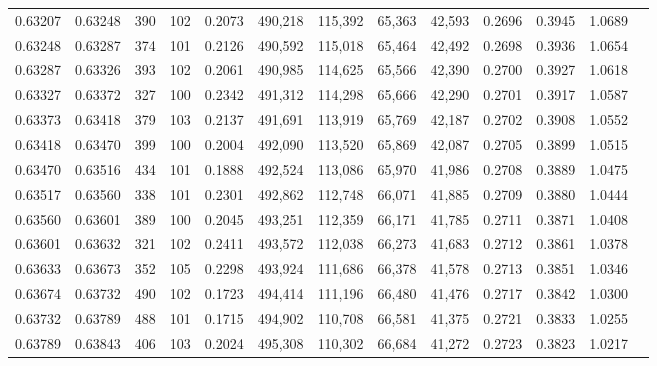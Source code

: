 \begin{tabular}{rrrrrrrrrrrrr}
0.63207 & 0.63248 &   390 & 102 &                                     0.2073 & 490,218 & 115,392 &  65,363 &  42,593 & 0.2696 & 0.3945 & 1.0689 \\
0.63248 & 0.63287 &   374 & 101 &                                     0.2126 & 490,592 & 115,018 &  65,464 &  42,492 & 0.2698 & 0.3936 & 1.0654 \\
0.63287 & 0.63326 &   393 & 102 &                                     0.2061 & 490,985 & 114,625 &  65,566 &  42,390 & 0.2700 & 0.3927 & 1.0618 \\
0.63327 & 0.63372 &   327 & 100 &                                     0.2342 & 491,312 & 114,298 &  65,666 &  42,290 & 0.2701 & 0.3917 & 1.0587 \\
0.63373 & 0.63418 &   379 & 103 &                                     0.2137 & 491,691 & 113,919 &  65,769 &  42,187 & 0.2702 & 0.3908 & 1.0552 \\
0.63418 & 0.63470 &   399 & 100 &                                     0.2004 & 492,090 & 113,520 &  65,869 &  42,087 & 0.2705 & 0.3899 & 1.0515 \\
0.63470 & 0.63516 &   434 & 101 &                                     0.1888 & 492,524 & 113,086 &  65,970 &  41,986 & 0.2708 & 0.3889 & 1.0475 \\
0.63517 & 0.63560 &   338 & 101 &                                     0.2301 & 492,862 & 112,748 &  66,071 &  41,885 & 0.2709 & 0.3880 & 1.0444 \\
0.63560 & 0.63601 &   389 & 100 &                                     0.2045 & 493,251 & 112,359 &  66,171 &  41,785 & 0.2711 & 0.3871 & 1.0408 \\
0.63601 & 0.63632 &   321 & 102 &                                     0.2411 & 493,572 & 112,038 &  66,273 &  41,683 & 0.2712 & 0.3861 & 1.0378 \\
0.63633 & 0.63673 &   352 & 105 &                                     0.2298 & 493,924 & 111,686 &  66,378 &  41,578 & 0.2713 & 0.3851 & 1.0346 \\
0.63674 & 0.63732 &   490 & 102 &                                     0.1723 & 494,414 & 111,196 &  66,480 &  41,476 & 0.2717 & 0.3842 & 1.0300 \\
0.63732 & 0.63789 &   488 & 101 &                                     0.1715 & 494,902 & 110,708 &  66,581 &  41,375 & 0.2721 & 0.3833 & 1.0255 \\
0.63789 & 0.63843 &   406 & 103 &                                     0.2024 & 495,308 & 110,302 &  66,684 &  41,272 & 0.2723 & 0.3823 & 1.0217 \\

\end{tabular}
